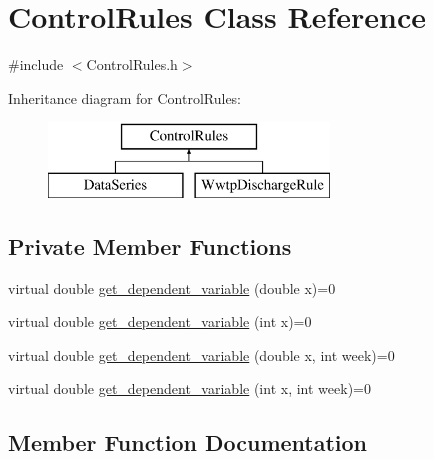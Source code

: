 \hypertarget{classControlRules}{}\section{Control\+Rules Class Reference}
\label{classControlRules}


{\ttfamily \#include $<$Control\+Rules.\+h$>$}

Inheritance diagram for Control\+Rules\+:\begin{figure}[H]
\begin{center}
\leavevmode
\includegraphics[height=2.000000cm]{classControlRules}
\end{center}
\end{figure}
\subsection*{Private Member Functions}
\begin{DoxyCompactItemize}
\item 
virtual double \mbox{\hyperlink{classControlRules_a749c604121ebb1df808df9cd957a09f1_a749c604121ebb1df808df9cd957a09f1}{get\+\_\+dependent\+\_\+variable}} (double x)=0
\item 
virtual double \mbox{\hyperlink{classControlRules_a56a42b40bf093237929a9c835dc9b772_a56a42b40bf093237929a9c835dc9b772}{get\+\_\+dependent\+\_\+variable}} (int x)=0
\item 
virtual double \mbox{\hyperlink{classControlRules_a4c5a86844c3d6409bfa0ba2b058f82e7_a4c5a86844c3d6409bfa0ba2b058f82e7}{get\+\_\+dependent\+\_\+variable}} (double x, int week)=0
\item 
virtual double \mbox{\hyperlink{classControlRules_a3d4b00d92729c6662473fc25707c0d9b_a3d4b00d92729c6662473fc25707c0d9b}{get\+\_\+dependent\+\_\+variable}} (int x, int week)=0
\end{DoxyCompactItemize}


\subsection{Member Function Documentation}
\mbox{\label{classControlRules_a749c604121ebb1df808df9cd957a09f1_a749c604121ebb1df808df9cd957a09f1}} 

